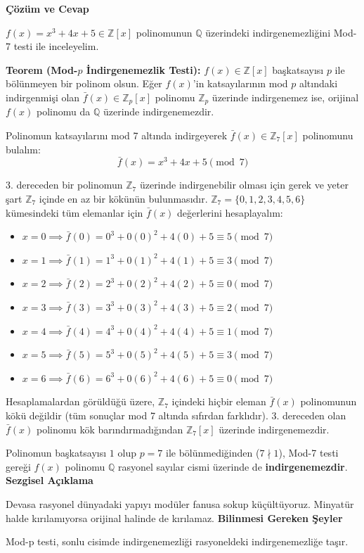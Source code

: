 \documentclass[11pt, a4paper]{article}
\newenvironment{cozum}{
    \vspace{0.5cm}
    \noindent\textcolor{green!60!black}{\faCheckCircle\enspace \textbf{\Large Çözüm ve Cevap}}\par\vspace{0.2cm}
}{}
\newenvironment{sezgisel}{
    \vspace{0.5cm}
    \noindent\textcolor{orange!80!black}{\faLightbulb\enspace \textbf{\Large Sezgisel Açıklama}}\par\vspace{0.2cm}
    \itshape
}{}
\newenvironment{bilgi}{
    \vspace{0.5cm}
    \noindent\textcolor{red!70!black}{\faExclamationTriangle\enspace \textbf{\Large Bilinmesi Gereken Şeyler}}\par\vspace{0.2cm}
}{}
\begin{document}
\begin{cozum}
$f(x) = x^{3} + 4x + 5 \in \mathbb{Z}[x]$ polinomunun $\mathbb{Q}$ üzerindeki indirgenemezliğini Mod-7 testi ile inceleyelim.

\textbf{Teorem (Mod-$p$ İndirgenemezlik Testi):} $f(x) \in \mathbb{Z}[x]$ başkatsayısı $p$ ile bölünmeyen bir polinom olsun. Eğer $f(x)$'in katsayılarının mod $p$ altındaki indirgenmişi olan $\bar{f}(x) \in \mathbb{Z}_p[x]$ polinomu $\mathbb{Z}_p$ üzerinde indirgenemez ise, orijinal $f(x)$ polinomu da $\mathbb{Q}$ üzerinde indirgenemezdir.

Polinomun katsayılarını mod 7 altında indirgeyerek $\bar{f}(x) \in \mathbb{Z}_{7}[x]$ polinomunu bulalım:
\[ \bar{f}(x) = x^{3} + 4x + 5 \pmod{7} \]

3. dereceden bir polinomun $\mathbb{Z}_{7}$ üzerinde indirgenebilir olması için gerek ve yeter şart $\mathbb{Z}_{7}$ içinde en az bir kökünün bulunmasıdır. $\mathbb{Z}_{7} = \{0, 1, 2, 3, 4, 5, 6\}$ kümesindeki tüm elemanlar için $\bar{f}(x)$ değerlerini hesaplayalım:
\begin{itemize}
    \item $x = 0 \implies \bar{f}(0) = 0^3 + 0(0)^2 + 4(0) + 5 \equiv 5 \pmod{7}$
    \item $x = 1 \implies \bar{f}(1) = 1^3 + 0(1)^2 + 4(1) + 5 \equiv 3 \pmod{7}$
    \item $x = 2 \implies \bar{f}(2) = 2^3 + 0(2)^2 + 4(2) + 5 \equiv 0 \pmod{7}$
    \item $x = 3 \implies \bar{f}(3) = 3^3 + 0(3)^2 + 4(3) + 5 \equiv 2 \pmod{7}$
    \item $x = 4 \implies \bar{f}(4) = 4^3 + 0(4)^2 + 4(4) + 5 \equiv 1 \pmod{7}$
    \item $x = 5 \implies \bar{f}(5) = 5^3 + 0(5)^2 + 4(5) + 5 \equiv 3 \pmod{7}$
    \item $x = 6 \implies \bar{f}(6) = 6^3 + 0(6)^2 + 4(6) + 5 \equiv 0 \pmod{7}$
\end{itemize}

Hesaplamalardan görüldüğü üzere, $\mathbb{Z}_{7}$ içindeki hiçbir eleman $\bar{f}(x)$ polinomunun kökü değildir (tüm sonuçlar mod 7 altında sıfırdan farklıdır). 3. dereceden olan $\bar{f}(x)$ polinomu kök barındırmadığından $\mathbb{Z}_{7}[x]$ üzerinde indirgenemezdir.

Polinomun başkatsayısı $1$ olup $p = 7$ ile bölünmediğinden ($7 \nmid 1$), Mod-7 testi gereği $f(x)$ polinomu $\mathbb{Q}$ rasyonel sayılar cismi üzerinde de \textbf{indirgenemezdir}.
\end{cozum}
\begin{sezgisel}
Devasa rasyonel dünyadaki yapıyı modüler fanusa sokup küçültüyoruz. Minyatür halde kırılamıyorsa orijinal halinde de kırılamaz.
\end{sezgisel}
\begin{bilgi}
Mod-p testi, sonlu cisimde indirgenemezliği rasyoneldeki indirgenemezliğe taşır.
\end{bilgi}
\end{document}
